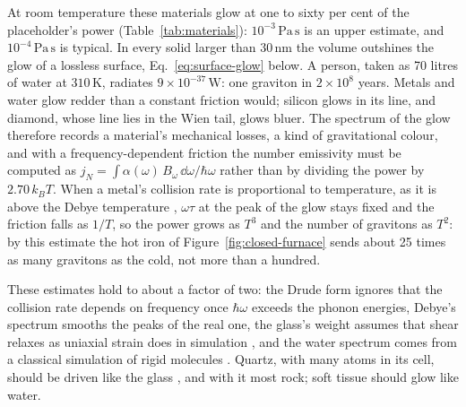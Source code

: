 At room temperature these materials glow at one to sixty per cent of the
placeholder's power (Table~\ref{tab:materials}): $10^{-3}\,\mathrm{Pa\,s}$ is an
upper estimate, and $10^{-4}\,\mathrm{Pa\,s}$ is typical. In every solid larger
than $30\,\mathrm{nm}$ the volume outshines the glow of a lossless surface,
Eq.~\eqref{eq:surface-glow} below. A person, taken as 70 litres of water at
$310\,\mathrm{K}$, radiates $9\times10^{-37}\,\mathrm{W}$: one graviton in
$2\times10^{8}$ years. Metals and water glow redder than a constant friction would; silicon glows in its line, and
diamond, whose line lies in the Wien tail, glows bluer. The spectrum of the glow
therefore records a material's mechanical losses, a kind of gravitational
colour, and with a frequency-dependent friction the number emissivity must be
computed as $j_N = \int \alpha(\omega)\,B_\omega\,\dd\omega/\hbar\omega$ rather
than by dividing the power by $2.70\,k_BT$. When a metal's collision rate is proportional to temperature, as it is above the
Debye temperature \cite{Duthil2014}, $\omega\tau$ at the peak of the glow stays
fixed and the friction falls as $1/T$, so the power grows as $T^3$ and the
number of gravitons as $T^2$: by this estimate the hot iron of
Figure~\ref{fig:closed-furnace} sends about 25 times as many gravitons as the
cold, not more than a hundred.

These estimates hold to about a factor of two: the Drude form ignores that the
collision rate depends on frequency once $\hbar\omega$ exceeds the phonon
energies, Debye's spectrum smooths the peaks of the real one, the glass's weight
assumes that shear relaxes as uniaxial strain does in simulation
\cite{Leonforte2006}, and the water spectrum comes from a classical simulation of
rigid molecules \cite{Schulz2020}. Quartz, with many atoms in its cell, should be
driven like the glass \cite{Damart2017}, and with it most rock; soft tissue
should glow like water.

